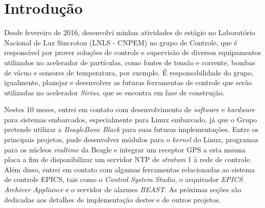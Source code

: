 \section {Introdução}

Desde fevereiro de 2016, desenvolvi minhas atividades de
estágio no Laboratório Nacional de Luz Sincroton (LNLS - CNPEM) no grupo de Controle, que
é responsável por prover soluções de controle e supervisão de diversos
equipamentos utilizados no acelerador de partículas, como fontes de tensão e
corrente, bombas de vácuo e sensores de temperatura, por exemplo. É
responsabilidade do grupo, igualmente, planejar e desenvolver as futuras
ferramentas de controle que serão utilizadas no acelerador \textit{Sirius}, que
se encontra em fase de construção.

\vspace{12pt}

Nestes 10 meses, entrei em contato com desenvolvimento
de \textit{software} e \textit{hardware} para sistemas embarcados, especialmente
para Linux embarcado, já que o Grupo pretende utilizar a
\textit{BeagleBone Black} para suas futuras
implementações. Entre os principais projetos, pude desenvolver módulos para o
\textit{kernel} do Linux, programas para os núcleos \textit{realtime} da Beagle
e integrar um receptor GPS a esta mesma placa a fim de disponibilizar um servidor NTP de \textit{stratum} 1 à
rede de controle. Além disso, entrei em contato com algumas ferramentas
relacionadas ao sistema de controle EPICS, tais como o
\textit{Control System Studio}, o arquivador \textit{EPICS Archiver Appliance}
e o servidor de alarmes \textit{BEAST}. As próximas seções são dedicadas aos
detalhes de implementação destes e de outros projetos.

\newpage
